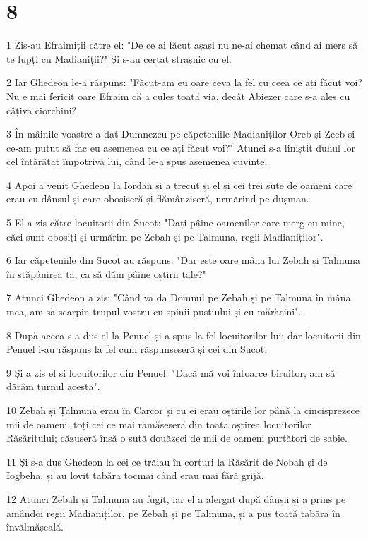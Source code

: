 \chapter{8}

\par 1 Zis-au Efraimiții către el: "De ce ai făcut așași nu ne-ai chemat când ai mers să te lupți cu Madianiții?" Și s-au certat strașnic cu el.
\par 2 Iar Ghedeon le-a răspuns: "Făcut-am eu oare ceva la fel cu ceea ce ați făcut voi? Nu e mai fericit oare Efraim că a cules toată via, decât Abiezer care s-a ales cu câțiva ciorchini?
\par 3 În mâinile voastre a dat Dumnezeu pe căpeteniile Madianiților Oreb și Zeeb și ce-am putut să fac eu asemenea cu ce ați făcut voi?" Atunci s-a liniștit duhul lor cel întărâtat împotriva lui, când le-a spus asemenea cuvinte.
\par 4 Apoi a venit Ghedeon la Iordan și a trecut și el și cei trei sute de oameni care erau cu dânsul și care obosiseră și flămânziseră, urmărind pe dușman.
\par 5 El a zis către locuitorii din Sucot: "Dați pâine oamenilor care merg cu mine, căci sunt obosiți și urmărim pe Zebah și pe Țalmuna, regii Madianiților".
\par 6 Iar căpeteniile din Sucot au răspuns: "Dar este oare mâna lui Zebah și Țalmuna în stăpânirea ta, ca să dăm pâine oștirii tale?"
\par 7 Atunci Ghedeon a zis: "Când va da Domnul pe Zebah și pe Țalmuna în mâna mea, am să scarpin trupul vostru cu spinii pustiului și cu mărăcini".
\par 8 După aceea s-a dus el la Penuel și a spus la fel locuitorilor lui; dar locuitorii din Penuel i-au răspuns la fel cum răspunseseră și cei din Sucot.
\par 9 Și a zis el și locuitorilor din Penuel: "Dacă mă voi întoarce biruitor, am să dărâm turnul acesta".
\par 10 Zebah și Țalmuna erau în Carcor și cu ei erau oștirile lor până la cincisprezece mii de oameni, toți cei ce mai rămăseseră din toată oștirea locuitorilor Răsăritului; căzuseră însă o sută douăzeci de mii de oameni purtători de sabie.
\par 11 Și s-a dus Ghedeon la cei ce trăiau în corturi la Răsărit de Nobah și de Iogbeha, și au lovit tabăra tocmai când erau mai fără grijă.
\par 12 Atunci Zebah și Țalmuna au fugit, iar el a alergat după dânșii și a prins pe amândoi regii Madianiților, pe Zebah și pe Țalmuna, și a pus toată tabăra în învălmășeală.
